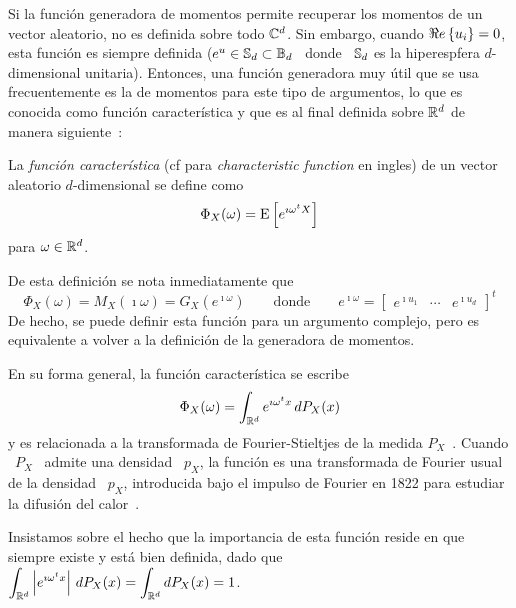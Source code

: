 \label{Ssec:MP:FuncionCaracteristica}

Si  la funci\'on generadora  de momentos  permite recuperar  los momentos  de un
vector  aleatorio, no  es definida  sobre todo  $\mathbb{C}^d$.  Sin  embargo, cuando
$\Re e \left\{ u_i \right\} = 0$,  esta funci\'on es siempre definida  ($e^u \in \mathbb{S}_d \subset
\mathbb{B}_d$   \   donde   \    $\mathbb{S}_d$   es   la   hiperespfera   $d$-dimensional
unitaria).   Entonces,  una  funci\'on   generadora  muy   \'util  que   se  usa
frecuentemente  es la  de  momentos para  este  tipo de  argumentos,  lo que  es
conocida  como funci\'on  caracter\'istica  y  que es  al  final definida  sobre
$\mathbb{R}^d$  de  manera  siguiente~\cite{Luk61,  Gol61,  Fel68,  JohKot97,  Muk00,
  AthLah06}:

\begin{definicion}\label{Def:MP:FuncionCaracteristica}
  La {\em funci\'on caracter\'istica}  (cf para {\em characteristic function} en
  ingles) de un vector aleatorio $d$-dimensional se define como
  \[
  \Phi_X(\omega) = \operatorname{E}\left[ e^{\imath \omega^t X} \right]
  \]
  para $\omega \in \mathbb{R}^d$.
\end{definicion}
%
De esta definici\'on se nota inmediatamente que
%
\[
\Phi_X(\omega) = M_X(\imath \omega) = G_X\left( e^{\imath \omega} \right) \qquad
\mbox{donde} \qquad e^{\imath \omega}  = \begin{bmatrix} e^{\imath u_1} & \cdots
  & e^{\imath u_d} \end{bmatrix}^t
\]
%
De hecho,  se puede definir esta  funci\'on para un argumento  complejo, pero es
equivalente a volver a la definici\'on de la generadora de momentos.

En su forma general, la funci\'on caracter\'istica se escribe
%
\[
\Phi_X(\omega) = \int_{\mathbb{R}^d} e^{\imath \omega^t x} \, dP_X(x)
\]
%
y  es  relacionada   a  la  transformada  de  Fourier-Stieltjes   de  la  medida
$P_X$~\cite[Chap.~5]{Pin09}. Cuando  \ $P_X$ \  admite una densidad \  $p_X$, la
funci\'on  es  una  transformada  de  Fourier  usual de  la  densidad  \  $p_X$,
introducida bajo el  impulso de Fourier en 1822 para  estudiar la difusi\'on del
calor~\cite{Fou22}.

Insistamos sobre  el hecho que  la importancia de  esta funci\'on reside  en que
siempre existe y est\'a bien  definida, dado que \ $\displaystyle \int_{\mathbb{R}^d}
\left| e^{\imath \omega^t x} \right| \, dP_X(x) = \int_{\mathbb{R}^d} dP_X(x) = 1$.

